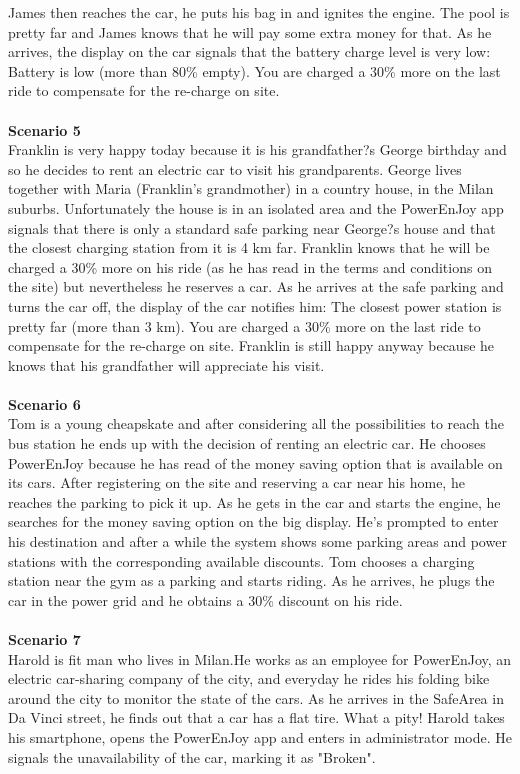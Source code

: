 \documentclass[11pt,a4paper]{report}
\begin{document}
James then reaches the car, he puts his bag in and ignites the engine. The pool is pretty far and James knows that he will pay some extra money for that. As he arrives, the display on the car signals that the battery charge level is very low: Battery is low (more than 80\% empty). You are charged a 30\% more on the last ride to compensate for the re-charge on site.\\ 
\noindent \\
\textbf{Scenario 5}\\
Franklin is very happy today because it is his grandfather?s George birthday and so he decides to rent an electric car to visit his grandparents. George lives together with Maria (Franklin's grandmother) in a country house, in the Milan suburbs. Unfortunately the house is in an isolated area and the PowerEnJoy app signals that there is only a standard safe parking near George?s house and that the closest charging station from it is 4 km far. Franklin knows that he will be charged a 30\% more on his ride (as he has read in the terms and conditions on the site) but nevertheless he reserves a car.
As he arrives at the safe parking and turns the car off, the display of the car notifies him: The closest power station is pretty far (more than 3 km). You are charged a 30\% more on the last ride to compensate for the re-charge on site. Franklin is still happy anyway because he knows that his grandfather will appreciate his visit.\\ 
\noindent \\
\textbf{Scenario 6}\\
Tom is a young cheapskate and after considering all the possibilities to reach the bus station he ends up with the decision of renting an electric car. He chooses PowerEnJoy because he has read of the money saving option that is available on its cars. After registering on the site and reserving a car near his home, he reaches the parking to pick it up. As he gets in the car and starts the engine, he searches for the money saving option on the big display. He's prompted to enter his destination and after a while the system shows some parking areas and power stations with the corresponding available discounts. Tom chooses a charging station near the gym as a parking and starts riding. As he arrives, he plugs the car in the power grid and he obtains a 30\% discount on his ride.\\
\noindent \\
\textbf{Scenario 7}\\ 
Harold is fit man who lives in Milan.He works as an employee for PowerEnJoy, an electric car-sharing company of the city, and everyday he rides his folding bike around the city to monitor the state of the cars. As he arrives in the SafeArea in Da Vinci street, he finds out  that a car has a flat tire. What a pity! Harold takes his smartphone, opens the PowerEnJoy app and enters in administrator mode. He signals the unavailability of the car, marking it as "Broken".\\
\end{document}
